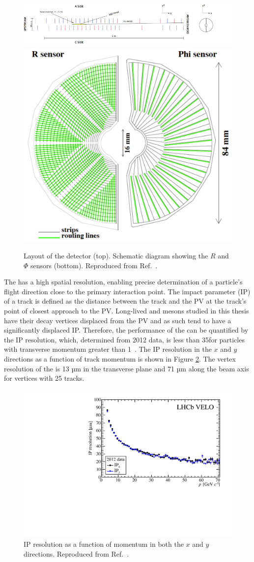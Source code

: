 \begin{figure}
\centering
\includegraphics[width=\linewidth]{figures/detector/VELO_detector_layout_crop.pdf}
\hfill
\includegraphics[width=0.3\linewidth]{figures/detector/randphisensors.pdf}
\caption{Layout of the \velo detector (top). Schematic diagram showing the $R$ and $\Phi$ sensors (bottom). Reproduced from Ref.~\cite{LHCb-DP-2014-002}.}
\label{velolayout}
\end{figure}

The \velo has a high spatial resolution, enabling precise determination of a particle's flight direction close to the primary interaction point. The impact parameter (IP) of a track is defined as the distance between the track and the PV at the track's point of closest approach to the PV. Long-lived \B and \D mesons studied in this thesis have their decay vertices displaced from the PV and as such tend to have a significantly displaced IP. Therefore, the performance of the \velo can be quantified by the IP resolution, which, determined from 2012 data, is less than 35\mum for particles with transverse momentum greater than 1\gevc~\cite{LHCb-DP-2014-001}. The IP resolution in the $x$ and $y$ directions as a function of track momentum is shown in Figure \ref{veloperformance}. The vertex resolution of the \velo is 13 µm in the transverse plane and 71 µm along the beam axis for vertices with 25 tracks.

\begin{figure}
\centering
\includegraphics[width=0.5\linewidth]{figures/detector/IPRes-Vs-P-CompareIPxIPy-2012.pdf}
\caption{IP resolution as a function of momentum in both the $x$ and $y$ directions. Reproduced from Ref.~\cite{LHCb-DP-2014-001}.}
\label{veloperformance}
\end{figure}

